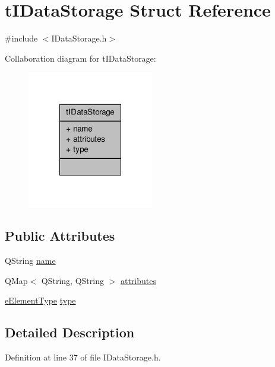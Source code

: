 \hypertarget{structt_i_data_storage}{\section{t\-I\-Data\-Storage Struct Reference}
\label{d9/d07/structt_i_data_storage}
}


{\ttfamily \#include $<$I\-Data\-Storage.\-h$>$}



Collaboration diagram for t\-I\-Data\-Storage\-:
\nopagebreak
\begin{figure}[H]
\begin{center}
\leavevmode
\includegraphics[width=156pt]{df/df1/structt_i_data_storage__coll__graph}
\end{center}
\end{figure}
\subsection*{Public Attributes}
\begin{DoxyCompactItemize}
\item 
Q\-String \hyperlink{structt_i_data_storage_a35e24f4bca7e31200c17e310b1ad1ad2}{name}
\item 
Q\-Map$<$ Q\-String, Q\-String $>$ \hyperlink{structt_i_data_storage_a1414513a860cd82fbf60007ddbd0d5b2}{attributes}
\item 
\hyperlink{_i_data_storage_8h_a0cea456c525689137e7b9f6401cb54cf}{e\-Element\-Type} \hyperlink{structt_i_data_storage_a9eb9d9fc94c3d3f945f11ca952006090}{type}
\end{DoxyCompactItemize}


\subsection{Detailed Description}


Definition at line 37 of file I\-Data\-Storage.\-h.



